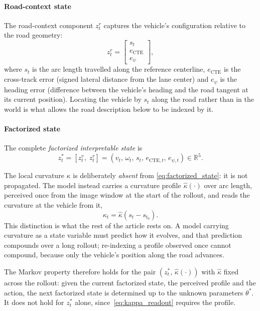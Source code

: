 \documentclass[preprint,12pt]{elsarticle}
\newcommand{\zv}{z^{v}}      %
\newcommand{\zr}{z^{r}}      %
\newcommand{\zstar}{z^{*}}   %
\begin{document}
\paragraph{Road-context state}
The road-context component $\zr_t$ captures the vehicle's configuration relative to
the road geometry:
\begin{equation}
    \zr_t =
    \begin{bmatrix}
        s_t \\ e_{\mathrm{CTE}} \\ e_{\psi}
    \end{bmatrix},
    \label{eq:road_ctx}
\end{equation}
where $s_t$ is the arc length travelled along the reference centerline,
$e_{\mathrm{CTE}}$ is the cross-track error (signed lateral distance from the lane
center) and $e_{\psi}$ is the heading error (difference between the vehicle's
heading and the road tangent at its current position).
Locating the vehicle by $s_t$ along the road rather than in the world is what
allows the road description below to be indexed by it.

\paragraph{Factorized state}
The complete \emph{factorized interpretable state} is
\begin{equation}
    \zstar_t = \left[ \zv_t,\; \zr_t \right]
             = \left( v_t,\, \omega_t,\, s_t,\, e_{\mathrm{CTE},t},\, e_{\psi,t} \right)
             \in \mathbb{R}^5 .
    \label{eq:factorized_state}
\end{equation}

The local curvature $\kappa$ is deliberately \emph{absent} from
\eqref{eq:factorized_state}: it is not propagated. The model instead carries a
curvature profile $\hat\kappa(\cdot)$ over arc length, perceived once from the
image window at the start of the rollout, and reads the curvature at the vehicle
from it,
\begin{equation}
    \kappa_t = \hat\kappa\!\left(s_t - s_{t_0}\right).
    \label{eq:kappa_readout}
\end{equation}
This distinction is what the rest of the article rests on. A model carrying
curvature as a state variable must predict how it evolves, and that prediction
compounds over a long rollout; re-indexing a profile observed once cannot compound,
because only the vehicle's position along the road advances.

The Markov property therefore holds for the pair
$\left(\zstar_t,\, \hat\kappa(\cdot)\right)$ with $\hat\kappa$ fixed across the
rollout: given the current factorized state, the perceived profile and the action,
the next factorized state is determined up to the unknown parameters $\theta^*$.
It does not hold for $\zstar_t$ alone, since~\eqref{eq:kappa_readout} requires the
profile.
\end{document}
